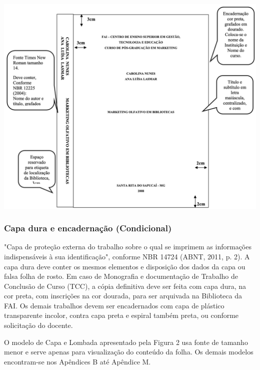 \documentclass[a4paper,12pt]{article}  %
\begin{document}
\begin{ElementosTextuais}
\begin{Desenvolvimento}
\begin{figura}[h!]
  \centering
  \addfigura
  \includegraphics[width=1\textwidth]{ilustracoes/figuras/Modelo de Capa e Lombada.png}
  \label{figura:ModeloDeCapaELombada}
\end{figura}

\subsubsection{Capa dura e encadernação (Condicional)}
"Capa de proteção externa do trabalho sobre o qual se imprimem as informações indispensáveis à sua identificação", conforme NBR 14724 (ABNT, 2011, p. 2). A capa dura deve conter os mesmos elementos e disposição dos dados da capa ou falsa folha de rosto. Em caso de Monografia e documentação de Trabalho de Conclusão de Curso (TCC), a cópia definitiva deve ser feita com capa dura, na cor preta, com inscrições na cor dourada, para ser arquivada na Biblioteca da FAI. Os demais trabalhos devem ser encadernados com capa de plástico transparente incolor, contra capa preta e espiral também preta, ou conforme solicitação do docente.

O modelo de Capa e Lombada apresentado pela Figura 2 usa fonte de tamanho menor e serve apenas para visualização do conteúdo da folha. Os demais modelos encontram-se nos Apêndices B até Apêndice M.


\end{Desenvolvimento}
\end{ElementosTextuais}
\end{document}
